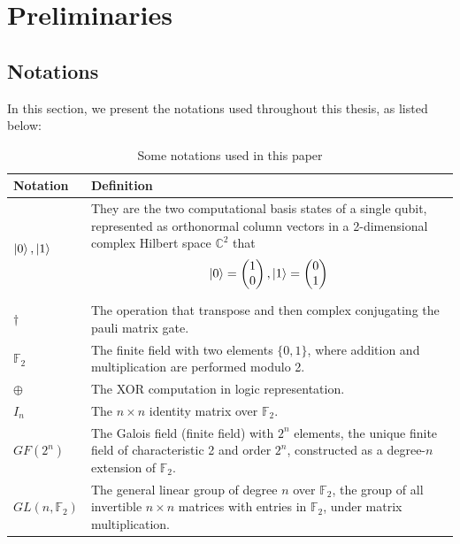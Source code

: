 
\chapter{Preliminaries}
\label{ch:preliminaries}

\section{Notations}
In this section, we present the notations used throughout this thesis, as listed below:

\begin{table}[H]
    \centering
    \begin{tabular}{ |p{2cm}||p{10cm}|  }
        \hline
        Notation  & Definition\\
         \hline
         $\ket{0}, \ket{1}$ & They are the two computational basis states of a single qubit, represented as orthonormal column vectors in a 2-dimensional complex Hilbert space $\mathbb{C}^{2}$ that $$\ket{0} = \begin{pmatrix}1 \\ 0\end{pmatrix}, \ket{1} = \begin{pmatrix}0 \\ 1\end{pmatrix}$$\\
         \hline
         $\dagger$ & The operation that transpose and then complex conjugating the pauli matrix gate.\\
         \hline
         $\mathbb{F}_{2}$ & The finite field with two elements $\{0, 1\}$, where addition and multiplication are performed modulo 2. \\
         \hline
         $\oplus$ & The XOR computation in logic representation.\\
         \hline
         $I_{n}$ & The $n \times n$ identity matrix over $\mathbb{F}_{2}$.\\
         \hline
         $GF(2^{n})$ & The Galois field (finite field) with $2^{n}$ elements, the unique finite field of characteristic 2 and order $2^{n}$, constructed as a degree-$n$ extension of $\mathbb{F}_{2}$.\\
         \hline
         $GL(n, \mathbb{F}_{2})$ & The general linear group of degree $n$ over $\mathbb{F}_{2}$, the group of all invertible $n \times n$ matrices with entries in $\mathbb{F}_{2}$, under matrix multiplication.\\
    \hline
\end{tabular}
    \caption{Some notations used in this paper}
    \label{tab:Notations}
\end{table}




